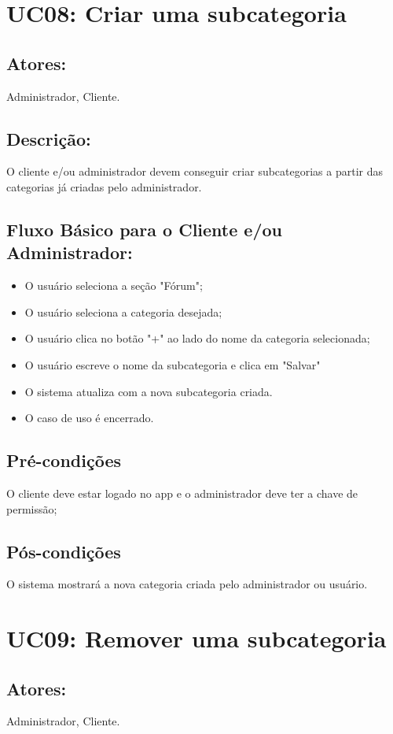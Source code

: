 \section{UC08: Criar uma subcategoria}

\subsection{Atores:}
 Administrador, Cliente.
\subsection{Descrição:}
O cliente e/ou administrador devem conseguir criar subcategorias a partir das categorias já criadas pelo administrador.
\subsection{Fluxo Básico para o Cliente e/ou Administrador: }

\begin{itemize}
    \item O usuário seleciona a seção "Fórum";
    \item O usuário seleciona a categoria desejada;
    \item O usuário clica no botão "+" ao lado do nome da categoria selecionada;
    \item O usuário escreve o nome da subcategoria e clica em "Salvar"
    \item O sistema atualiza com a nova subcategoria criada. 
    \item O caso de uso é encerrado. 
\end{itemize}

\subsection{Pré-condições}
O cliente deve estar logado no app e o administrador deve ter a chave de permissão;
\subsection{Pós-condições}
O sistema mostrará a nova categoria criada pelo administrador ou usuário. 
\section{UC09: Remover uma subcategoria}

\subsection{Atores:}
Administrador, Cliente.
